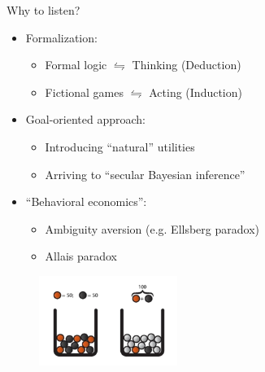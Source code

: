 \documentclass{beamer}
\theoremstyle{definition}
\begin{document}
\begin{frame}{Why to listen?}

\begin{itemize}
    \item Formalization:
    \begin{itemize}
        \item Formal logic $\leftrightharpoons$ Thinking (Deduction) 
        \item Fictional games $\leftrightharpoons$ Acting (Induction)
    \end{itemize}
    \item Goal-oriented approach:
    \begin{itemize}
        \item Introducing ``natural'' utilities
        \item Arriving to ``secular Bayesian inference''
    \end{itemize}
    \item ``Behavioral economics'':
    \begin{itemize}
        \item Ambiguity aversion (e.g. Ellsberg paradox) 
        \item Allais paradox 
    \end{itemize}
    
\end{itemize}

\begin{figure}[H]
    \centering
    \href{https://arxiv.org/abs/1707.07556}{\includegraphics[width=0.4\textwidth]{img/Ellsberg-urn_alpha.png}}
    \label{fig:EllsbergUrns}
\end{figure}


\end{frame}
\end{document}

